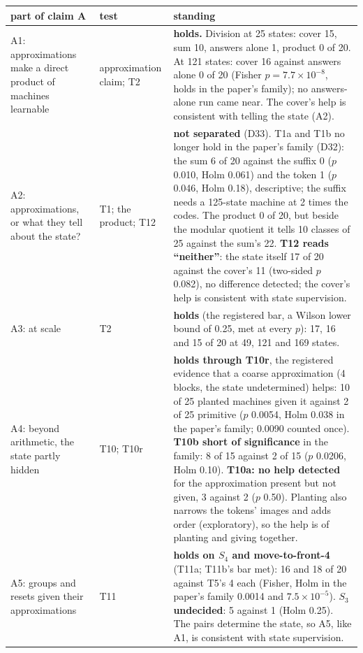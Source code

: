 \documentclass[11pt]{article}
\begin{document}
\begin{center}
\footnotesize
\begin{tabularx}{\textwidth}{p{}lX}
\toprule
part of claim A & test & standing \\
\midrule
A1: approximations make a direct product of machines learnable & approximation claim; T2 & \textbf{holds.}
Division at 25 states: cover 15, sum 10, answers alone 1, product 0 of 20. At 121 states: cover 16
against answers alone 0 of 20 (Fisher $p = 7.7 \times 10^{-8}$, holds in the paper's family); no
answers-alone run came near. The cover's help is consistent with telling the state (A2). \\
A2: approximations, or what they tell about the state? & T1; the product; T12 & \textbf{not
separated} (D33). T1a and T1b no longer hold in the paper's family (D32): the sum 6 of 20 against
the suffix 0 ($p$ 0.010, Holm 0.061) and the token 1 ($p$ 0.046, Holm 0.18), descriptive; the suffix
needs a 125-state machine at 2 times the codes. The product 0 of 20, but beside the modular quotient
it tells 10 classes of 25 against the sum's 22. \textbf{T12 reads ``neither''}: the state itself 17
of 20 against the cover's 11 (two-sided $p$ 0.082), no difference detected; the cover's help is
consistent with state supervision. \\
A3: at scale & T2 & \textbf{holds} (the registered bar, a Wilson lower bound of 0.25, met at every
$p$): 17, 16 and 15 of 20 at 49, 121 and 169 states. \\
A4: beyond arithmetic, the state partly hidden & T10; T10r & \textbf{holds through T10r}, the
registered evidence that a coarse approximation (4 blocks, the state undetermined) helps: 10 of 25
planted machines given it against 2 of 25 primitive ($p$ 0.0054, Holm 0.038 in the paper's family;
0.0090 counted once). \textbf{T10b short of significance} in the family: 8 of 15 against 2 of 15
($p$ 0.0206, Holm 0.10). \textbf{T10a: no help detected} for the approximation present but not
given, 3 against 2 ($p$ 0.50). Planting also narrows the tokens' images and adds order
(exploratory), so the help is of planting and giving together. \\
A5: groups and resets given their approximations & T11 & \textbf{holds on $S_4$ and
move-to-front-4} (T11a; T11b's bar met): 16 and 18 of 20 against T5's 4 each (Fisher, Holm in the paper's family
0.0014 and $7.5 \times 10^{-5}$). $S_3$ \textbf{undecided}: 5 against 1 (Holm 0.25). The pairs
determine the state, so A5, like A1, is consistent with state supervision. \\

\end{tabularx}
\end{center}
\end{document}
